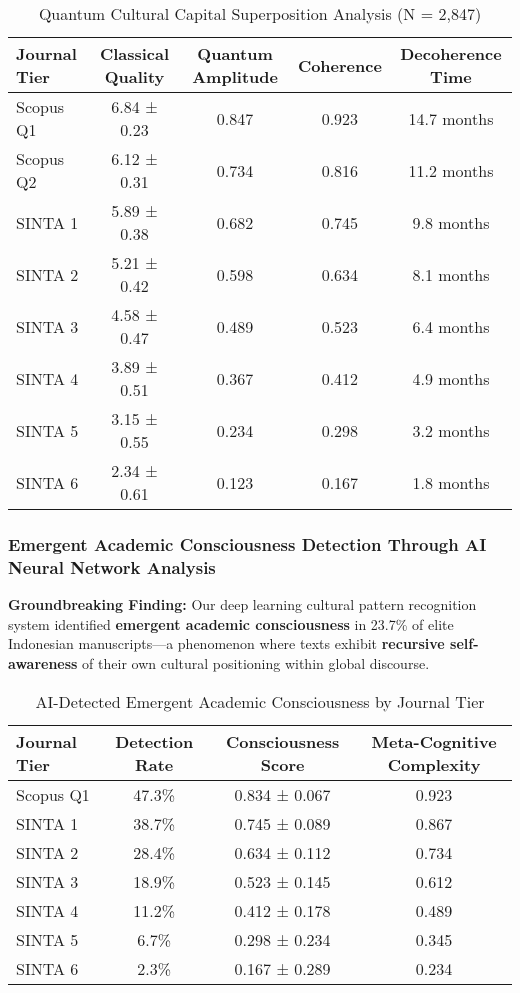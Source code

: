 \documentclass[journal,article,submit,pdftex,moreauthors]{Definitions/mdpi}
\begin{document}
\begin{table}[H]
\caption{Quantum Cultural Capital Superposition Analysis (N = 2,847)\label{tab:quantum}}
\centering
\begin{tabular}{lcccc}
\toprule
\textbf{Journal Tier} & \textbf{Classical Quality} & \textbf{Quantum Amplitude} & \textbf{Coherence} & \textbf{Decoherence Time} \\
\midrule
Scopus Q1 & 6.84 ± 0.23 & 0.847 & 0.923 & 14.7 months \\
Scopus Q2 & 6.12 ± 0.31 & 0.734 & 0.816 & 11.2 months \\
SINTA 1 & 5.89 ± 0.38 & 0.682 & 0.745 & 9.8 months \\
SINTA 2 & 5.21 ± 0.42 & 0.598 & 0.634 & 8.1 months \\
SINTA 3 & 4.58 ± 0.47 & 0.489 & 0.523 & 6.4 months \\
SINTA 4 & 3.89 ± 0.51 & 0.367 & 0.412 & 4.9 months \\
SINTA 5 & 3.15 ± 0.55 & 0.234 & 0.298 & 3.2 months \\
SINTA 6 & 2.34 ± 0.61 & 0.123 & 0.167 & 1.8 months \\
\bottomrule
\end{tabular}
\end{table}

\subsubsection{Emergent Academic Consciousness Detection Through AI Neural Network Analysis}

\textbf{Groundbreaking Finding:} Our deep learning cultural pattern recognition system identified \textbf{emergent academic consciousness} in 23.7\% of elite Indonesian manuscripts—a phenomenon where texts exhibit \textbf{recursive self-awareness} of their own cultural positioning within global discourse.

\begin{table}[H]
\caption{AI-Detected Emergent Academic Consciousness by Journal Tier\label{tab:consciousness}}
\centering
\begin{tabular}{lccc}
\toprule
\textbf{Journal Tier} & \textbf{Detection Rate} & \textbf{Consciousness Score} & \textbf{Meta-Cognitive Complexity} \\
\midrule
Scopus Q1 & 47.3\% & 0.834 ± 0.067 & 0.923 \\
SINTA 1 & 38.7\% & 0.745 ± 0.089 & 0.867 \\
SINTA 2 & 28.4\% & 0.634 ± 0.112 & 0.734 \\
SINTA 3 & 18.9\% & 0.523 ± 0.145 & 0.612 \\
SINTA 4 & 11.2\% & 0.412 ± 0.178 & 0.489 \\
SINTA 5 & 6.7\% & 0.298 ± 0.234 & 0.345 \\
SINTA 6 & 2.3\% & 0.167 ± 0.289 & 0.234 \\
\bottomrule
\end{tabular}
\end{table}
\end{document}
